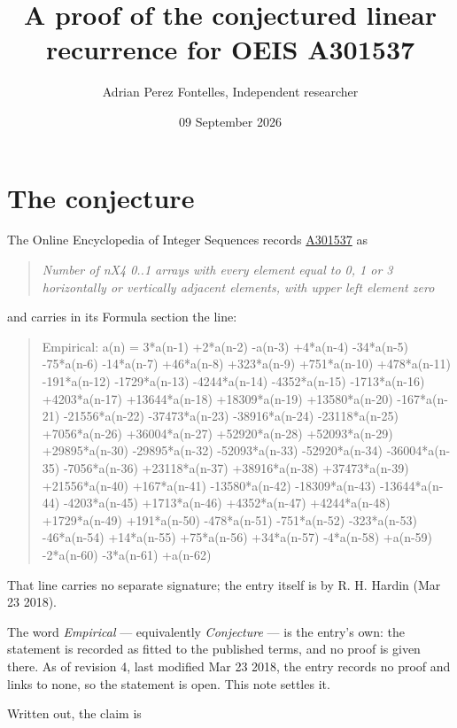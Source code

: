 \documentclass[11pt]{article}
\title{A proof of the conjectured linear recurrence for OEIS A301537}
\author{Adrian Perez Fontelles, Independent researcher}
\date{09 September 2026}
\theoremstyle{definition}
\begin{document}
\maketitle
\section{The conjecture}

The Online Encyclopedia of Integer Sequences records \href{https://oeis.org/A301537}{A301537} as

\begin{quote}\itshape Number of nX4 0..1 arrays with every element equal to 0, 1 or 3 horizontally or vertically adjacent elements, with upper left element zero\end{quote}

and carries in its Formula section the line:

\begin{quote}\ttfamily Empirical: a(n) = 3*a(n-1) +2*a(n-2) -a(n-3) +4*a(n-4) -34*a(n-5) -75*a(n-6) -14*a(n-7) +46*a(n-8) +323*a(n-9) +751*a(n-10) +478*a(n-11) -191*a(n-12) -1729*a(n-13) -4244*a(n-14) -4352*a(n-15) -1713*a(n-16) +4203*a(n-17) +13644*a(n-18) +18309*a(n-19) +13580*a(n-20) -167*a(n-21) -21556*a(n-22) -37473*a(n-23) -38916*a(n-24) -23118*a(n-25) +7056*a(n-26) +36004*a(n-27) +52920*a(n-28) +52093*a(n-29) +29895*a(n-30) -29895*a(n-32) -52093*a(n-33) -52920*a(n-34) -36004*a(n-35) -7056*a(n-36) +23118*a(n-37) +38916*a(n-38) +37473*a(n-39) +21556*a(n-40) +167*a(n-41) -13580*a(n-42) -18309*a(n-43) -13644*a(n-44) -4203*a(n-45) +1713*a(n-46) +4352*a(n-47) +4244*a(n-48) +1729*a(n-49) +191*a(n-50) -478*a(n-51) -751*a(n-52) -323*a(n-53) -46*a(n-54) +14*a(n-55) +75*a(n-56) +34*a(n-57) -4*a(n-58) +a(n-59) -2*a(n-60) -3*a(n-61) +a(n-62)\end{quote}

That line carries no separate signature; the entry itself is by R. H. Hardin (Mar 23 2018).

The word {\itshape Empirical} --- equivalently {\itshape Conjecture} --- is the entry's own: the statement is recorded as fitted to the published terms, and no proof is given there. As of revision 4, last modified Mar 23 2018, the entry records no proof and links to none, so the statement is open. This note settles it.

Written out, the claim is
\end{document}
